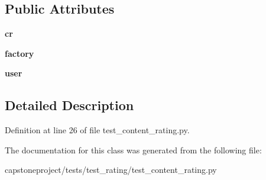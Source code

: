 \subsection*{Public Attributes}
\begin{DoxyCompactItemize}
\item 
\mbox{\label{classcapstoneproject_1_1tests_1_1test__rating_1_1test__content__rating_1_1_test_tokenize_a902a55d5e5668511ed012707576649f1}} 
{\bfseries cr}
\item 
\mbox{\label{classcapstoneproject_1_1tests_1_1test__rating_1_1test__content__rating_1_1_test_tokenize_afd70ea1fc6ff221c50c325853205fd56}} 
{\bfseries factory}
\item 
\mbox{\label{classcapstoneproject_1_1tests_1_1test__rating_1_1test__content__rating_1_1_test_tokenize_a238a9722215f56f7beb91f6f37c96e77}} 
{\bfseries user}
\end{DoxyCompactItemize}


\subsection{Detailed Description}


Definition at line 26 of file test\+\_\+content\+\_\+rating.\+py.



The documentation for this class was generated from the following file\+:\begin{DoxyCompactItemize}
\item 
capstoneproject/tests/test\+\_\+rating/test\+\_\+content\+\_\+rating.\+py\end{DoxyCompactItemize}
